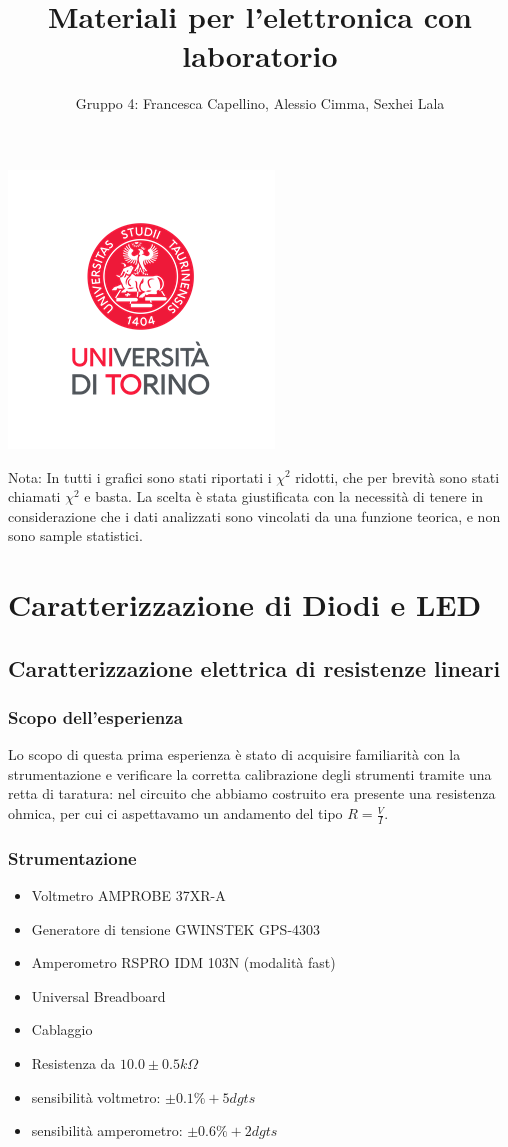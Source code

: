 \documentclass{article}
\title{Materiali per l'elettronica con laboratorio}
\author{Gruppo 4: Francesca Capellino, Alessio Cimma, Sexhei Lala}
\begin{document}
\maketitle

\begin{center}
    \includegraphics*[width=0.22\linewidth]{../images/logo.png}
\end{center}

\tableofcontents

\newpage
Nota: In tutti i grafici sono stati riportati i $\chi^2$ ridotti, che per brevità sono stati chiamati $\chi^2$ e basta. La scelta è stata giustificata con la necessità di tenere in considerazione che i dati analizzati sono vincolati da una funzione teorica, e non sono sample statistici.
\section{Caratterizzazione di Diodi e LED}

\subsection{Caratterizzazione elettrica di resistenze lineari}

\subsubsection{Scopo dell'esperienza}

Lo scopo di questa prima esperienza è stato di acquisire familiarità con la strumentazione e verificare la corretta calibrazione degli strumenti tramite una retta di taratura: nel circuito che abbiamo costruito era presente una resistenza ohmica, per cui ci aspettavamo un andamento del tipo $R=\frac{V}{I}$. 

\subsubsection{Strumentazione}

\begin{itemize} 
    \item Voltmetro AMPROBE 37XR-A
    \item Generatore di tensione GWINSTEK GPS-4303 
    \item Amperometro RSPRO IDM 103N (modalità fast)
    \item Universal Breadboard
    \item Cablaggio
    \item Resistenza da $10.0\pm0.5 k \Omega$
    \item sensibilità voltmetro: $\pm0.1\% + 5 dgts$
    \item sensibilità amperometro: $\pm0.6\%+2 dgts$
\end{itemize}
\end{document}
